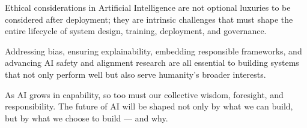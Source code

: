 \documentclass[openany]{book}
\begin{document}
Ethical considerations in Artificial Intelligence are not optional luxuries to 
be considered after deployment; they are intrinsic challenges that must shape 
the entire lifecycle of system design, training, deployment, and governance.

Addressing bias, ensuring explainability, embedding responsible frameworks, and 
advancing AI safety and alignment research are all essential to building systems 
that not only perform well but also serve humanity's broader interests.

As AI grows in capability, so too must our collective wisdom, foresight, and 
responsibility. The future of AI will be shaped not only by what we can build, 
but by what we choose to build — and why.
\end{document}
